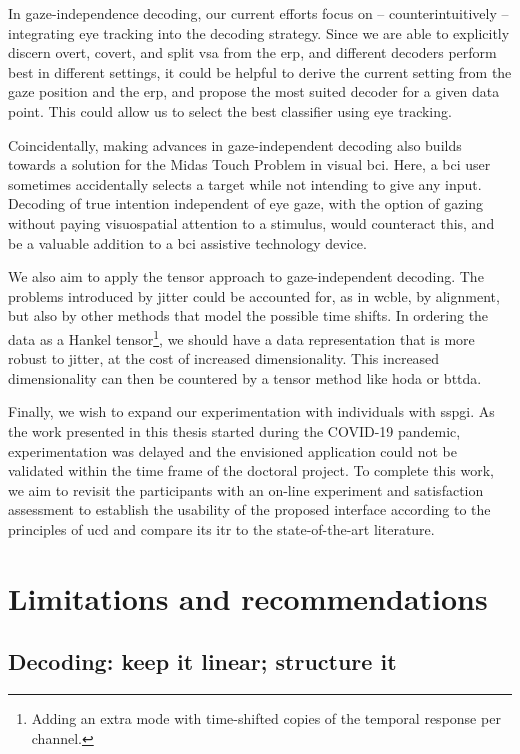 In gaze-independence decoding, our current efforts focus on --
counterintuitively -- integrating eye tracking into the decoding strategy.
Since we are able to explicitly discern overt, covert, and split \ac{vsa} from
the \ac{erp}, and different decoders perform best in different settings, it
could be helpful to derive the current setting from the gaze position and the
\ac{erp}, and propose the most suited decoder for a given data point.
This could allow us to select the best classifier using eye tracking.

Coincidentally, making advances in gaze-independent decoding also builds towards a
solution for the Midas Touch Problem in visual \ac{bci}.
Here, a \ac{bci} user sometimes accidentally selects a target while not intending
to give any input.
Decoding of true intention independent of eye
gaze, with the option of gazing without paying visuospatial attention to a
stimulus, would counteract this, and be a valuable addition to a \ac{bci}
assistive technology device.

We also aim to apply the tensor approach to gaze-independent decoding.
The problems introduced by jitter could be accounted for, as in \ac{wcble}, by
alignment, but also by other methods that model the possible time shifts.
In ordering the data as a Hankel tensor\footnote{Adding an extra mode with
time-shifted copies of the temporal response per channel.}, we should have a
data representation that is more robust to jitter, at the cost of increased
dimensionality.
This increased dimensionality can then be countered by a tensor method like
\ac{hoda} or \ac{bttda}.

Finally, we wish to expand our experimentation with individuals with
\ac{sspgi}.
As the work presented in this thesis started during the COVID-19 pandemic,
experimentation was delayed and the envisioned application could not be
validated within the time frame of the doctoral project.
To complete this work, we aim to revisit the participants with an on-line
experiment and satisfaction assessment to establish the usability of the proposed
interface according to the principles of \ac{ucd} and
compare its \ac{itr} to the state-of-the-art literature.

\section{Limitations and recommendations}

\subsection{Decoding: keep it linear; structure it}

